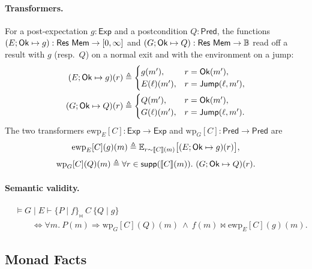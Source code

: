 \documentclass[acmsmall,natbib,review,screen,anonymous,10pt]{acmart}
\begin{document}
\paragraph{Transformers.}
For a post-expectation $g:\mathsf{Exp}$ and a postcondition
$Q:\mathsf{Pred}$, the functions
$(E;\mathsf{Ok}\mapsto g):\mathsf{Res}\ \mathsf{Mem}\to[0,\infty]$ and
$(G;\mathsf{Ok}\mapsto Q):\mathsf{Res}\ \Mem\to\Bool$ read off a result with
$g$ (resp.\ $Q$) on a normal exit and with the environment on a jump:
\begin{align}
  (E;\mathsf{Ok}\mapsto g)(r)
  &\triangleq
  \begin{cases}
    g(m'),&r=\mathsf{Ok}(m'),\\
    E(\ell)(m'),&r=\mathsf{Jump}(\ell,m'),
  \end{cases}
  \nonumber\\
  (G;\mathsf{Ok}\mapsto Q)(r)
  &\triangleq
  \begin{cases}
    Q(m'),&r=\mathsf{Ok}(m'),\\
    G(\ell)(m'),&r=\mathsf{Jump}(\ell,m').
  \end{cases}
  \label{eq:ljwp-okmap}
\end{align}
The two transformers $\mathrm{ewp}_{E}[C]:\mathsf{Exp}\to\mathsf{Exp}$
and $\mathrm{wp}_{G}[C]:\mathsf{Pred}\to\mathsf{Pred}$ are
\begin{equation}
  \mathrm{ewp}_{E}[C](g)(m)
  \triangleq
  \mathbb E_{r\sim\llbracket C\rrbracket(m)}
  \bigl[(E;\mathsf{Ok}\mapsto g)(r)\bigr],
  \label{eq:ljwp-wp}
\end{equation}
\begin{equation}
  \mathrm{wp}_{G}[C](Q)(m)
  \triangleq
  \forall r\in\mathsf{supp}(\llbracket C\rrbracket(m)).\
  (G;\mathsf{Ok}\mapsto Q)(r).
  \label{eq:ljwp-wpG}
\end{equation}
\paragraph{Semantic validity.}
\begin{equation}
  \begin{aligned}
  &\models G\mid E\vdash\{P\mid f\}_{\bowtie}\ C\ \{Q\mid g\}\\
  &\qquad\iff
  \forall m.\ P(m)\Longrightarrow
  \mathrm{wp}_{G}[C](Q)(m)
  \ \land\
  f(m)\mathrel{\bowtie}\mathrm{ewp}_{E}[C](g)(m).
  \end{aligned}
  \label{eq:ljwp-validity}
\end{equation}

\subsection{Monad Facts}\label{app:lj-monad}
\end{document}

